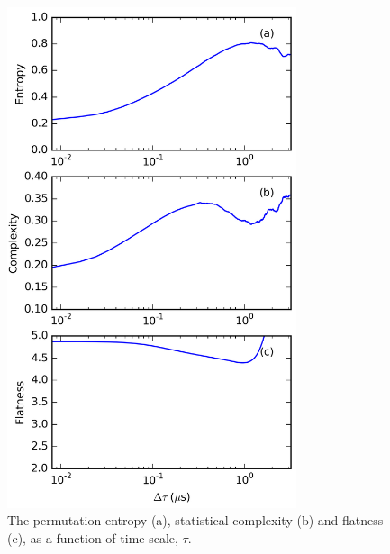 \documentclass[aip,pop,amsmath,amssymb,preprint,superscriptaddress]{revtex4-1} %
\begin{document}
\begin{figure}
\centerline{
\includegraphics[width=8.5cm]{figure3.jpg}}
\caption{\label{fig:PESC}The permutation entropy (a), statistical complexity (b) and flatness (c), as a function of time scale, $\tau$.}
\end{figure}
\end{document}
